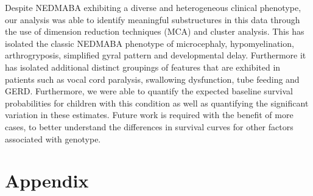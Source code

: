 \documentclass[
  authoryear,
  preprint,
  3p]{elsarticle}
\begin{document}
Despite NEDMABA exhibiting a diverse and heterogeneous clinical
phenotype, our analysis was able to identify meaningful substructures in
this data through the use of dimension reduction techniques (MCA) and
cluster analysis. This has isolated the classic NEDMABA phenotype of
microcephaly, hypomyelination, arthrogryposis, simplified gyral pattern
and developmental delay. Furthermore it has isolated additional distinct
groupings of features that are exhibited in patients such as vocal cord
paralysis, swallowing dysfunction, tube feeding and GERD. Furthermore,
we were able to quantify the expected baseline survival probabilities
for children with this condition as well as quantifying the significant
variation in these estimates. Future work is required with the benefit
of more cases, to better understand the differences in survival curves
for other factors associated with genotype.

\newpage

\hypertarget{appendix}{%
\section{Appendix}\label{appendix}}
\end{document}
